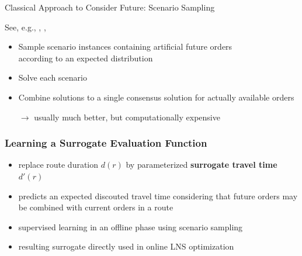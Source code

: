 \documentclass[aspectratio=1610]{beamer}
\newcommand{\important}[1]{{\color{green!60!black}#1}}
\begin{document}
\begin{frame}{Classical Approach to Consider Future: Scenario Sampling}

See, e.g., \cite{voccia2019same}, \cite{Bent2004}, \cite{Hvattum2006}

\bigskip
\begin{itemize}
	\itemsep2ex
	\item \important{Sample scenario instances} containing artificial future orders\\ according to an expected distribution
	\item \important{Solve} each scenario
	\item Combine solutions to a single \important{consensus solution} for actually available orders
	\item[$\rightarrow$] usually \important{much better}, but \alert{computationally expensive}
\end{itemize}
\end{frame}


\begin{frame}
	\frametitle{Learning a Surrogate Evaluation Function}
	
	{\small\color{gray}\cite{bracher-21}}
	
	\vfill
	
	\bigskip
	\begin{itemize}
		\itemsep2ex
		\item replace route duration $d(r)$ by parameterized \important{\bf surrogate travel time} $d'(r)$
		\item predicts an expected \important{discouted travel time} considering that future orders may be combined with current orders in a route
		\item \important{supervised learning} in an \important{offline} phase using \important{scenario sampling}
		\item resulting surrogate directly used in online LNS optimization
	\end{itemize}
	\bigskip
\end{frame}

\end{document}
